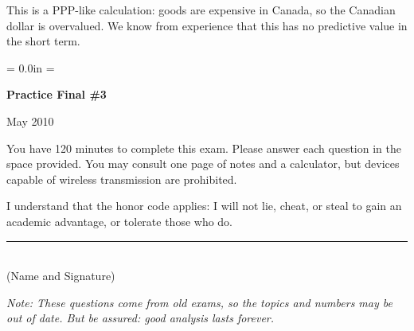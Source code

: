 \documentclass[letterpaper,12pt]{exam}
\def\HeadName{Practice Final \#1}
\begin{document}
\begin{questions}
\begin{solution}
\begin{parts}
\item This is a PPP-like calculation:  goods are expensive in Canada,
so the Canadian dollar is overvalued.
We know from experience that this has no predictive value in the short term.
\end{parts}
\end{solution}

\end{questions}




\newpage
\def\HeadName{Practice Final \#3}
\parindent = 0.0in
\parskip = \bigskipamount
\thispagestyle{empty}
\Head

\centerline{\large \bf \HeadName}%
\centerline{May 2010}

\bigskip
You have 120 minutes to complete this exam.  Please answer each
question in the space provided. You may consult one page of notes
and a calculator, but devices capable of wireless transmission are
prohibited.

I understand that the honor code applies: I will not lie, cheat,
or steal to gain an academic advantage, or tolerate those who do.

\begin{flushright}
\rule{4in}{0.5pt} \\ (Name and Signature)
\end{flushright}

{\it Note:  These questions come from old exams,
so the topics and numbers may be out of date.
But be assured:  good analysis lasts forever.}
\end{document}

